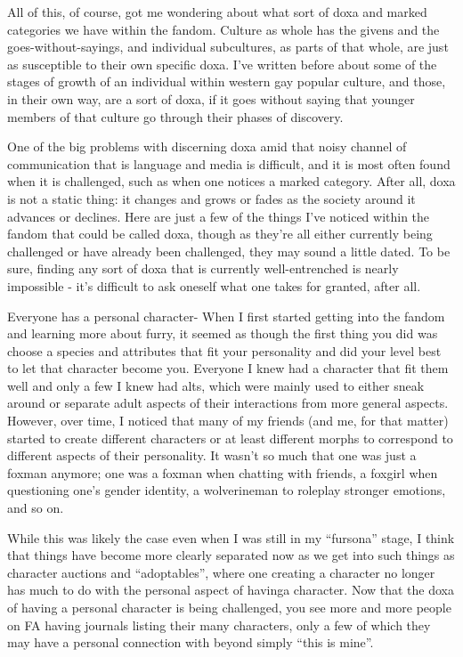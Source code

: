 All of this, of course, got me wondering about what sort of doxa and marked categories we have within the fandom. Culture as whole has the givens and the goes-without-sayings, and individual subcultures, as parts of that whole, are just as susceptible to their own specific doxa. I've written before about some of the stages of growth of an individual within western gay popular culture, and those, in their own way, are a sort of doxa, if it goes without saying that younger members of that culture go through their phases of discovery.

One of the big problems with discerning doxa amid that noisy channel of communication that is language and media is difficult, and it is most often found when it is challenged, such as when one notices a marked category. After all, doxa is not a static thing: it changes and grows or fades as the society around it advances or declines. Here are just a few of the things I've noticed within the fandom that could be called doxa, though as they're all either currently being challenged or have already been challenged, they may sound a little dated. To be sure, finding any sort of doxa that is currently well-entrenched is nearly impossible - it's difficult to ask oneself what one takes for granted, after all.

Everyone has a personal character- When I first started getting into the fandom and learning more about furry, it seemed as though the first thing you did was choose a species and attributes that fit your personality and did your level best to let that character become you. Everyone I knew had a character that fit them well and only a few I knew had alts, which were mainly used to either sneak around or separate adult aspects of their interactions from more general aspects. However, over time, I noticed that many of my friends (and me, for that matter) started to create different characters or at least different morphs to correspond to different aspects of their personality. It wasn't so much that one was just a foxman anymore; one was a foxman when chatting with friends, a foxgirl when questioning one's gender identity, a wolverineman to roleplay stronger emotions, and so on.

While this was likely the case even when I was still in my ``fursona'' stage, I think that things have become more clearly separated now as we get into such things as character auctions and ``adoptables'', where one creating a character no longer has much to do with the personal aspect of havinga character. Now that the doxa of having a personal character is being challenged, you see more and more people on FA having journals listing their many characters, only a few of which they may have a personal connection with beyond simply ``this is mine''.

